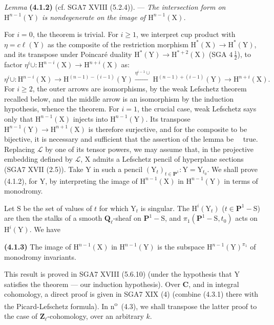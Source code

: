 \documentclass[11pt,leqno]{article}
\newcommand{\Page}[1]{\ifvmode\noindent\else\unskip\ \fi{\footnotesize\textcolor{gray}{[p.\,#1]}}\ \ignorespaces}
\begin{document}
\textit{Lemma} \textbf{(4.1.2)} (cf. SGA7 XVIII (5.2.4)). — \textit{The intersection form on \(\mathrm{H}^{n-1}(\mathrm{Y})\) is nondegenerate on the image of \(\mathrm{H}^{n-1}(\mathrm{X})\).}

For \(i=0\), the theorem is trivial. For \(i\geq1\), we interpret cup product with \(\eta=c\ell(\mathrm{Y})\) as the composite of the restriction morphism \(\mathrm{H}^*(\mathrm{X})\to\mathrm{H}^*(\mathrm{Y})\), and its transpose under Poincaré duality \(\mathrm{H}^*(\mathrm{Y})\to\mathrm{H}^{*+2}(\mathrm{X})\) (SGA \(4\,\frac12\)), to factor \(\eta^i\cup:\mathrm{H}^{n-i}(\mathrm{X})\to\mathrm{H}^{n+i}(\mathrm{X})\) as:
\[
\eta^i\cup:\mathrm{H}^{n-i}(\mathrm{X})
\to\mathrm{H}^{(n-1)-(i-1)}(\mathrm{Y})
\xrightarrow{\eta^{i-1}\cup}
\mathrm{H}^{(n-1)+(i-1)}(\mathrm{Y})
\to\mathrm{H}^{n+i}(\mathrm{X}).
\]
For \(i\geq2\), the outer arrows are isomorphisms, by the weak Lefschetz theorem recalled below, and the middle arrow is an isomorphism by the induction hypothesis, whence the theorem. For \(i=1\), the crucial case, weak Lefschetz says only that \(\mathrm{H}^{n-1}(\mathrm{X})\) injects into \(\mathrm{H}^{n-1}(\mathrm{Y})\). Its transpose \(\mathrm{H}^{n-1}(\mathrm{Y})\to\mathrm{H}^{n+1}(\mathrm{X})\) is therefore surjective, and for the composite to be bijective, it is necessary and sufficient that the assertion of the lemma be
\Page{218}true. Replacing \(\mathscr{L}\) by one of its tensor powers, we may assume that, in the projective embedding defined by \(\mathscr{L}\), \(\mathrm{X}\) admits a Lefschetz pencil of hyperplane sections (SGA7 XVII (2.5)). Take \(\mathrm{Y}\) in such a pencil \((\mathrm{Y}_t)_{t\in\mathbf{P}^1}:\mathrm{Y}=\mathrm{Y}_{t_0}\). We shall prove (4.1.2), for \(\mathrm{Y}\), by interpreting the image of \(\mathrm{H}^{n-1}(\mathrm{X})\) in \(\mathrm{H}^{n-1}(\mathrm{Y})\) in terms of monodromy.

Let \(\mathrm{S}\) be the set of values of \(t\) for which \(\mathrm{Y}_t\) is singular. The \(\mathrm{H}^i(\mathrm{Y}_t)\) (\(t\in\mathbf{P}^1-\mathrm{S}\)) are then the stalks of a smooth \(\mathbf{Q}_\ell\)-sheaf on \(\mathbf{P}^1-\mathrm{S}\), and \(\pi_1(\mathbf{P}^1-\mathrm{S},t_0)\) acts on \(\mathrm{H}^i(\mathrm{Y})\). We have

\textbf{(4.1.3)} The image of \(\mathrm{H}^{n-1}(\mathrm{X})\) in \(\mathrm{H}^{n-1}(\mathrm{Y})\) is the subspace \(\mathrm{H}^{n-1}(\mathrm{Y})^{\pi_1}\) of monodromy invariants.

This result is proved in SGA7 XVIII (5.6.10) (under the hypothesis that \(\mathrm{Y}\) satisfies the theorem — our induction hypothesis). Over \(\mathbf{C}\), and in integral cohomology, a direct proof is given in SGA7 XIX (4) (combine (4.3.1) there with the Picard-Lefschetz formula). In n\textsuperscript{o}~(4.3), we shall transpose the latter proof to the case of \(\mathbf{Z}_\ell\)-cohomology, over an arbitrary \(k\).
\end{document}
